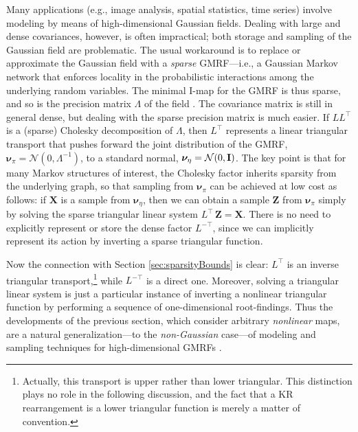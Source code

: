 \documentclass[twoside,11pt]{article}
\newcommand{\Gauss}{\mathcal{N}}                                      %
\newcommand{\genm}{\boldsymbol{\nu} }   %
\newcommand{\Xb}{\boldsymbol{X}}
\newcommand{\Zb}{\boldsymbol{Z}}
\begin{document}
Many applications (e.g., image analysis, spatial statistics, time
series) involve modeling by means of high-dimensional Gaussian
fields.  Dealing with large and dense covariances, however, is often
impractical; both storage and sampling of the Gaussian field are
problematic.  The usual workaround is to replace or approximate the
Gaussian field with a {\it sparse} GMRF---i.e., a Gaussian Markov
network that enforces locality in the probabilistic interactions among
the underlying random variables.  The minimal I-map for the GMRF is
thus sparse, and so is the precision matrix $\Lambda$ 
%
%
%
%
of the field \citep{rue2005gaussian}.  The covariance matrix is still
in general dense, but dealing with the sparse precision matrix is much
easier.  If $L L^\top$ is a (sparse) Cholesky decomposition of
$\Lambda$, 
%
%
%
%
then $L^\top$ represents a linear triangular
transport that pushes forward 
the joint distribution of the GMRF,
$\genm_\pi = \Gauss(0,\Lambda^{-1})$, to
a standard normal,
$\genm_\eta = \Gauss(0,{\bf I})$.
%
%
%
%
%
%
%
The key point is that for many Markov
structures of interest, the Cholesky factor inherits sparsity from the
underlying graph, so that sampling from $\genm_\pi$ can be achieved at low
cost as follows: if $\Xb$ is a sample from $\genm_\eta$, then we can obtain a sample
$\Zb$ from $\genm_\pi$ simply by solving the sparse triangular linear system
$L^\top\,\Zb = \Xb$.  There is no need to explicitly represent or
store the dense factor $L^{-\top}$, since we can implicitly represent
its action by inverting a sparse triangular function.

Now the connection with Section \ref{sec:sparsityBounds} is clear: 
%
%
$L^\top$ is an inverse triangular
transport,\footnote{Actually, this transport is upper rather than
lower triangular. This distinction plays no role in the following
discussion, and the fact that a KR rearrangement is a
lower triangular function is merely a matter of convention.}
%
%
%
%
while $L^{-\top}$ is a direct one.
%
Moreover, solving
a triangular linear system is just a particular instance of inverting
a nonlinear triangular function by performing a sequence of
one-dimensional root-findings.
%
Thus the developments of the previous section, which consider
arbitrary \textit{nonlinear} maps, are a natural generalization---to the
{\it non-Gaussian} case---of modeling and sampling techniques for
high-dimensional GMRFs \citep{rue2005gaussian}.

%
%
%
%
%
%
%
%

%
%
%
%
%
%
%
%
%
%
\end{document}
